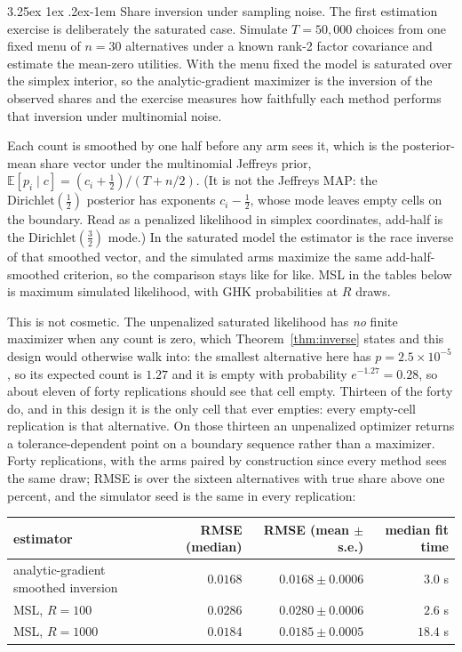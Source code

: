 \documentclass[11pt]{article}
\makeatletter
\renewcommand\paragraph{\@startsection{paragraph}{4}{\z@}%
  {3.25ex \@plus1ex \@minus.2ex}{-1em}%
  {\normalfont\normalsize\itshape}}
\makeatother
\begin{document}
\paragraph{Share inversion under sampling noise.} The first estimation
exercise is deliberately the saturated case. Simulate $T=50{,}000$ choices
from one fixed menu of $n=30$ alternatives under a known rank-2 factor
covariance and estimate the mean-zero utilities. With
the menu fixed the model is saturated over the simplex interior, so the
analytic-gradient maximizer is the inversion of the observed shares and the
exercise measures how faithfully each method performs that inversion
under multinomial noise.

Each count is smoothed by one half before any arm sees it, which is the
posterior-mean share vector under the multinomial Jeffreys prior,
$\mathbb{E}[p_i\mid c]=(c_i+\tfrac12)/(T+n/2)$. (It is not the Jeffreys
MAP: the $\mathrm{Dirichlet}(\tfrac12)$ posterior has exponents
$c_i-\tfrac12$, whose mode leaves empty cells on the boundary. Read as a
penalized likelihood in simplex coordinates, add-half is the
$\mathrm{Dirichlet}(\tfrac32)$ mode.) In the saturated model the estimator
is the race inverse of that smoothed vector, and the simulated arms
maximize the same add-half-smoothed criterion, so the comparison stays
like for like. MSL in the tables below is maximum simulated
likelihood, with GHK probabilities at $R$ draws.

This is not cosmetic. The unpenalized saturated likelihood has \emph{no}
finite maximizer when any count is zero, which Theorem~\ref{thm:inverse}
states and this design would otherwise walk into: the smallest
alternative here has $p=2.5\times10^{-5}$, so its expected count is
$1.27$ and it is empty with probability $e^{-1.27}=0.28$, so about
eleven of forty replications should see that cell empty. Thirteen of the
forty do, and in this design it is the only cell that ever empties: every
empty-cell replication is that alternative. On those thirteen an
unpenalized optimizer returns a tolerance-dependent point on a boundary
sequence rather than a maximizer. Forty replications, with the arms paired by construction
since every method sees the same draw; RMSE is over the sixteen alternatives
with true share above one percent, and the simulator seed is the same in
every replication:

\begin{center}\small
\begin{tabular}{lrrr}
\toprule
estimator & RMSE (median) & RMSE (mean $\pm$ s.e.) & median fit time \\
\midrule
analytic-gradient smoothed inversion & $0.0168$ & $0.0168\pm0.0006$ & $3.0$ s \\
MSL, $R=100$ & $0.0286$ & $0.0280\pm0.0006$ & $2.6$ s \\
MSL, $R=1000$ & $0.0184$ & $0.0185\pm0.0005$ & $18.4$ s \\
\bottomrule
\end{tabular}
\end{center}
\end{document}
